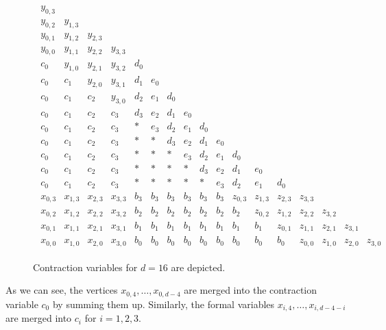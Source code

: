 \begin{figure}[H]
    \begin{align*}
        \begin{array}{cccccccccccccccccccc}
            y_{0,3} & & & & & & & & & & & & \\
            y_{0,2} & y_{1,3} & & & & & & & & & & & \\
            y_{0,1} & y_{1,2} & y_{2,3} & & & & & & & & & & \\
            y_{0,0} & y_{1,1} & y_{2,2} & y_{3,3} & & & & & & & & & \\
            c_0 & y_{1,0} & y_{2,1} & y_{3,2} & d_0 & & & & & & & & \\
            c_0 & c_1 & y_{2,0} & y_{3,1} & d_1 & e_0 & & & & & & & \\
            c_0 & c_1 & c_2 & y_{3,0} & d_2 & e_1 & d_0 & & & & & & \\
            c_0 & c_1 & c_2 & c_3 & d_3 & e_2 & d_1 & e_0 & & & & & \\
            c_0 & c_1 & c_2 & c_3 &  *  & e_3 & d_2 & e_1 & d_0 & & & & \\
            c_0 & c_1 & c_2 & c_3 &  *  & * & d_3 & e_2 & d_1 & e_0 & & & \\
            c_0 & c_1 & c_2 & c_3 &  *  & * & * & e_3 & d_2 & e_1 & d_0 & & \\
            c_0 & c_1 & c_2 & c_3 &  *  & * & * & * & d_3 & e_2 & d_1 & e_0 & \\
            c_0 & c_1 & c_2 & c_3 &  *  & * & * & * & * & e_3 & d_2 & e_1 & d_0 \\
            x_{0,3} & x_{1,3} & x_{2,3} & x_{3,3} & b_3 & b_3 & b_3 & b_3 & b_3 & b_3 & z_{0,3} & z_{1,3} & z_{2,3} & z_{3,3} \\
            x_{0,2} & x_{1,2} & x_{2,2} & x_{3,2} & b_2 & b_2 & b_2 & b_2 & b_2 & b_2 & b_2 & z_{0,2} & z_{1,2} & z_{2,2} & z_{3,2} \\
            x_{0,1} & x_{1,1} & x_{2,1} & x_{3,1} & b_1 & b_1 & b_1 & b_1 & b_1 & b_1 & b_1 & b_1 & z_{0,1} & z_{1,1} & z_{2,1} & z_{3,1} \\
            x_{0,0} & x_{1,0} & x_{2,0} & x_{3,0} & b_0 & b_0 & b_0 & b_0 & b_0 & b_0 & b_0 & b_0 & b_0 & z_{0,0} & z_{1,0} & z_{2,0} & z_{3,0}
        \end{array}
    \end{align*}  
    \caption{Contraction variables for \( d = 16 \) are depicted.}
\end{figure}

As we can see, the vertices \( x_{0,4}, \dots, x_{0, d-4} \) are merged into the contraction variable \( c_0 \) by summing them up. Similarly, the formal variables \( x_{i,4}, \dots, x_{i,d-4-i} \) are merged into \( c_i \) for \( i = 1,2,3 \).

